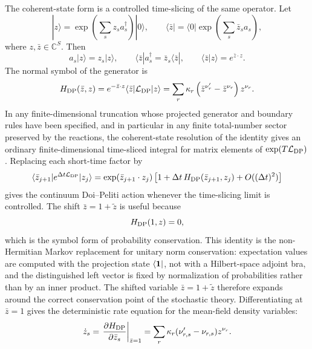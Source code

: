 The coherent-state form is a controlled time-slicing of the same operator.
Let
\[
  |z\rangle=\exp\!\left(\sum_s z_sa_s^\dagger\right)|0\rangle,
  \qquad
  \langle\bar z|=\langle0|\exp\!\left(\sum_s \bar z_sa_s\right),
\]
where \(z,\bar z\in\mathbb C^S\).  Then
\[
  a_s|z\rangle=z_s|z\rangle,
  \qquad
  \langle\bar z|a_s^\dagger=\bar z_s\langle\bar z|,
  \qquad
  \langle\bar z|z\rangle=e^{\bar z\cdot z}.
\]
The normal symbol of the generator is
\begin{equation}
  H_{\rm DP}(\bar z,z)
  =
  e^{-\bar z\cdot z}
  \langle\bar z|\mathcal L_{\rm DP}|z\rangle
  =
  \sum_r
  \kappa_r
  \left(\bar z^{\nu'_r}-\bar z^{\nu_r}\right)z^{\nu_r}.
  \label{eq:doi-peliti-normal-symbol}
\end{equation}
In any finite-dimensional truncation whose projected generator and boundary
rules have been specified, and in particular in any finite total-number
sector preserved by the reactions, the coherent-state resolution of the
identity gives an ordinary finite-dimensional time-sliced integral for
matrix elements of \(\exp(T\mathcal L_{\rm DP})\).  Replacing each
short-time factor by
\[
  \langle\bar z_{j+1}|e^{\Delta t\mathcal L_{\rm DP}}|z_j\rangle
  =
  \exp(\bar z_{j+1}\cdot z_j)
  \left[
    1+\Delta t\,H_{\rm DP}(\bar z_{j+1},z_j)+O((\Delta t)^2)
  \right]
\]
gives the continuum Doi--Peliti action whenever the time-slicing limit is
controlled.  The shift \(\bar z=1+\widetilde z\) is useful because
\[
  H_{\rm DP}(1,z)=0,
\]
which is the symbol form of probability conservation.  This identity is the
non-Hermitian Markov replacement for unitary norm conservation: expectation
values are computed with the projection state \(\langle{\bf 1}|\), not with a
Hilbert-space adjoint bra, and the distinguished left vector is fixed by
normalization of probabilities rather than by an inner product.  The shifted
variable \(\bar z=1+\widetilde z\) therefore expands around the correct
conservation point of the stochastic theory.  Differentiating at
\(\bar z=1\) gives the deterministic rate equation for the mean-field density
variables:
\begin{equation}
  \dot z_s
  =
  \left.
  \frac{\partial H_{\rm DP}}{\partial\bar z_s}
  \right|_{\bar z=1}
  =
  \sum_r
  \kappa_r(\nu'_{r,s}-\nu_{r,s})z^{\nu_r}.
  \label{eq:doi-peliti-mean-field-rate-equation}
\end{equation}

